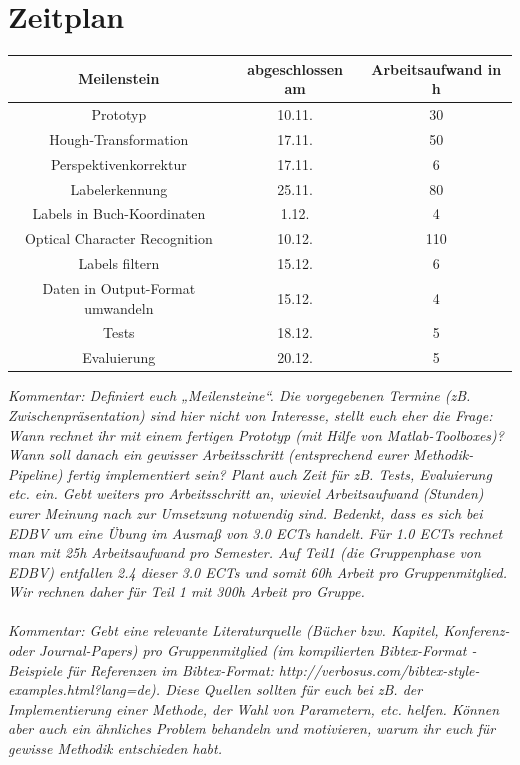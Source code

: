 \documentclass[deutsch]{scrartcl}
\begin{document}
\section{Zeitplan}
\begin{table}[h!]
	\centering
		\begin{tabular}{|c|c|c|}
		\hline
		Meilenstein & abgeschlossen am & Arbeitsaufwand in h\\
		\hline
		Prototyp & 10.11. & 30\\
		\hline
		Hough-Transformation & 17.11. & 50\\
		\hline
		Perspektivenkorrektur & 17.11. & 6\\
		\hline
		Labelerkennung & 25.11. & 80\\
		\hline
		Labels in Buch-Koordinaten & 1.12. & 4\\
		\hline
		Optical Character Recognition & 10.12. & 110\\
		\hline
		Labels filtern & 15.12. & 6\\
		\hline
		Daten in Output-Format umwandeln & 15.12. & 4\\
		\hline
		Tests & 18.12. & 5\\
		\hline
		Evaluierung & 20.12. & 5 \\
		\hline
		\end{tabular}
\end{table}
\textit{Kommentar: Definiert euch „Meilensteine“. Die vorgegebenen Termine (zB. Zwischenpräsentation) sind hier nicht von Interesse, stellt euch eher die Frage: Wann rechnet ihr mit einem fertigen Prototyp (mit Hilfe von Matlab-Toolboxes)? Wann soll danach ein gewisser Arbeitsschritt (entsprechend eurer Methodik-Pipeline) fertig implementiert sein? Plant auch Zeit für zB. Tests, Evaluierung etc. ein.
Gebt weiters pro Arbeitsschritt an, wieviel Arbeitsaufwand (Stunden) eurer Meinung nach zur Umsetzung notwendig sind. Bedenkt, dass es sich bei EDBV um eine Übung im Ausmaß von 3.0 ECTs handelt. Für 1.0 ECTs rechnet man mit 25h Arbeitsaufwand pro Semester. Auf Teil1 (die Gruppenphase von EDBV) entfallen 2.4 dieser 3.0 ECTs und somit 60h Arbeit pro Gruppenmitglied. Wir rechnen daher für Teil 1 mit 300h Arbeit pro Gruppe.
}\\
\\
\textit{Kommentar: Gebt eine relevante Literaturquelle (Bücher bzw. Kapitel, Konferenz- oder Journal-Papers) pro Gruppenmitglied (im kompilierten Bibtex-Format - Beispiele für Referenzen im Bibtex-Format: http://verbosus.com/bibtex-style-examples.html?lang=de). Diese Quellen sollten für euch bei zB. der Implementierung einer Methode, der Wahl von Parametern, etc. helfen. Können aber auch ein ähnliches Problem behandeln und motivieren, warum ihr euch für gewisse Methodik entschieden habt.}

\nocite{*}

\end{document}
